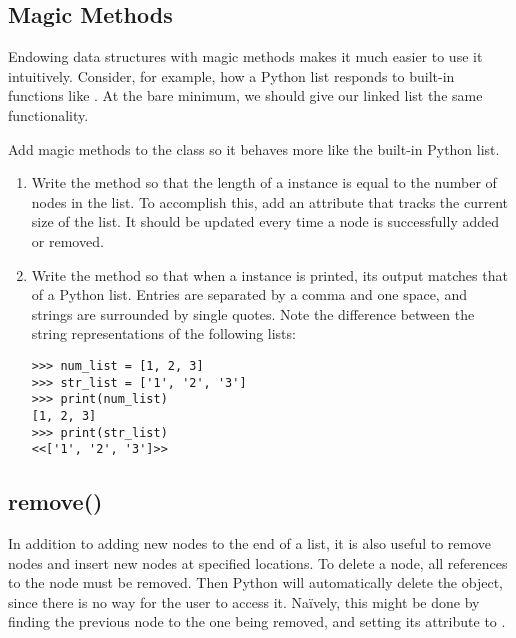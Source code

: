 \subsection*{Magic Methods} %

Endowing data structures with magic methods makes it much easier to use it intuitively.
Consider, for example, how a Python list responds to built-in functions like . %
At the bare minimum, we should give our linked list the same functionality.

\begin{problem} %
Add magic methods to the  class so it behaves more like the built-in Python list.
\begin{enumerate}
\item Write the  method so that the length of a  instance is equal to the number of nodes in the list.
To accomplish this, add an attribute that tracks the current size of the list.
It should be updated every time a node is successfully added or removed.

\item Write the  method so that when a  instance is printed, its output matches that of a Python list.
Entries are separated by a comma and one space, and strings are surrounded by single quotes.
Note the difference between the string representations of the following lists:

\begin{lstlisting}
>>> num_list = [1, 2, 3]
>>> str_list = ['1', '2', '3']
>>> print(num_list)
[1, 2, 3]
>>> print(str_list)
<<['1', '2', '3']>>
\end{lstlisting}
\end{enumerate}
\end{problem}

\subsection*{remove()} %

In addition to adding new nodes to the end of a list, it is also useful to remove nodes and insert new nodes at specified locations.
To delete a node, all references to the node must be removed.
Then Python will automatically delete the object, since there is no way for the user to access it.
Na{\"i}vely, this might be done by finding the previous node to the one being removed, and setting its  attribute to .

